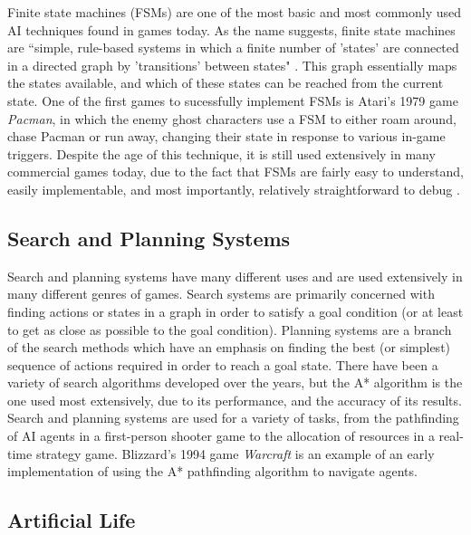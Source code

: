 \documentclass[a4paper,oneside]{report}
\begin{document}
Finite state machines (FSMs) are one of the most basic and most commonly used AI techniques found in games today. As the name suggests, finite state machines are ``simple, rule-based systems in which a finite number of 'states' are connected in a directed graph by 'transitions' between states" \cite{:hc}. This graph essentially maps the states available, and which of these states can be reached from the current state. One of the first games to sucessfully implement FSMs is Atari's 1979 game \emph{Pacman}, in which the enemy ghost characters use a FSM to either roam around, chase Pacman or run away, changing their state in response to various in-game triggers. Despite the age of this technique, it is still used extensively in many commercial games today, due to the fact that FSMs are fairly easy to understand, easily implementable, and most importantly, relatively straightforward to debug \cite{Bourg:2004tg}.

\subsection{Search and Planning Systems} 

Search and planning systems have many different uses and are used extensively in many different genres of games. Search systems are primarily concerned with finding actions or states in a graph in order to satisfy a goal condition (or at least to get as close as possible to the goal condition). Planning systems are a branch of the search methods which have an emphasis on finding the best (or simplest) sequence of actions required in order to reach a goal state. There have been a variety of search algorithms developed over the years, but the A* algorithm is the one used most extensively, due to its performance, and the accuracy of its results. Search and planning systems are used for a variety of tasks, from the pathfinding of AI agents in a first-person shooter game to the allocation of resources in a real-time strategy game. Blizzard's 1994 game \emph{Warcraft} is an example of an early implementation of using the A* pathfinding algorithm to navigate agents.

\subsection{Artificial Life} 
\end{document}
